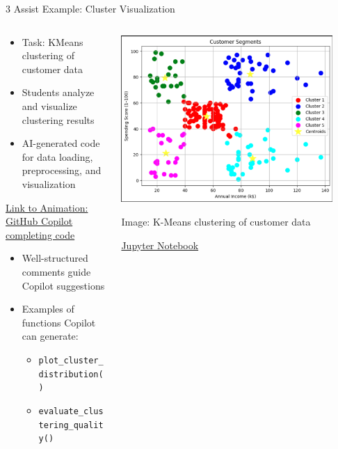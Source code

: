 \documentclass[xcolor=dvipsnames, aspectratio=169]{beamer}
\begin{document}
\begin{frame}{3 Assist Example: Cluster Visualization}
  \begin{columns}
    \begin{column}{0.6\textwidth}
      \begin{itemize}
        \item Task: KMeans clustering of customer data
        \item Students analyze and visualize clustering results
        \item AI-generated code for data loading, preprocessing, and visualization
      \end{itemize}
      \vspace{0.5em}
      \href{https://github.com/neu-ece-esl/ai-prog-workshop/tree/main/3-assist}{Link to Animation: GitHub Copilot completing code}
      \vspace{0.5em}
      \begin{itemize}
        \item Well-structured comments guide Copilot suggestions
        \item Examples of functions Copilot can generate:
        \begin{itemize}
          \item \texttt{plot\_cluster\_distribution()}
          \item \texttt{evaluate\_clustering\_quality()}
        \end{itemize}
      \end{itemize}
    \end{column}
    
    \begin{column}{0.4\textwidth}
      \includegraphics[width=0.9\textwidth]{../3-assist/Cluster.jpeg}
      \tiny\centerline{Image: K-Means clustering of customer data}
      \tiny\centerline{\href{https://github.com/neu-ece-esl/ai-prog-workshop/blob/main/3-assist/KMeans_Clustering.ipynb}{Jupyter Notebook}}


\end{column}
\end{columns}
\end{frame}
\end{document}
